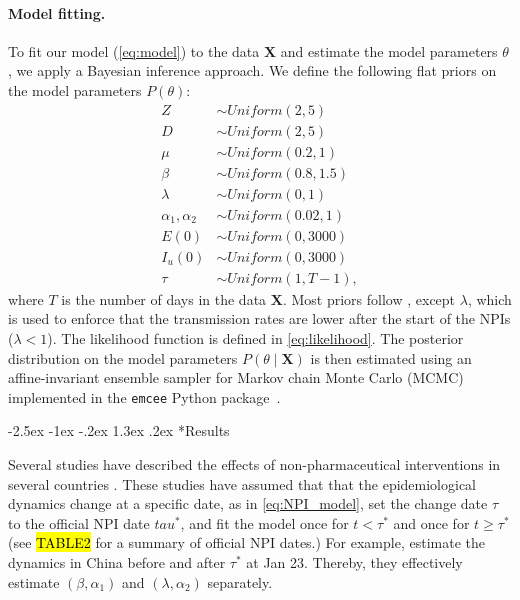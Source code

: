\documentclass[12pt]{extarticle}
\makeatletter
\renewcommand\section{\@startsection {section}{1}{\z@}%
     {-2.5ex \@plus -1ex \@minus -.2ex}%
     {1.3ex \@plus.2ex}%
    {\Large\bfseries}}
\let\vec\mathbf
\makeatother
\begin{document}
\paragraph*{Model fitting.}
To fit our model (\autoref{eq:model}) to the data $\vec{X}$ and estimate the model parameters $\theta$, we apply a Bayesian inference approach.
We define the following flat priors on the model parameters $P(\theta)$:
\begin{equation} \label{eq:priors}
\begin{aligned} %
Z & \sim \mathit{Uniform}(2, 5) \\
D & \sim \mathit{Uniform}(2, 5) \\
\mu & \sim \mathit{Uniform}(0.2, 1) \\
\beta & \sim \mathit{Uniform}(0.8, 1.5) \\
\lambda & \sim \mathit{Uniform}(0, 1) \\
\alpha_1, \alpha_2 & \sim \mathit{Uniform}(0.02, 1)\\
E(0) & \sim \mathit{Uniform}(0, 3000) \\
I_u(0) & \sim \mathit{Uniform}(0, 3000) \\
\tau &\sim \mathit{Uniform}(1, T-1),
\end{aligned}
\end{equation}
where $T$ is the number of days in the data $\vec{X}$.
Most priors follow \citet{Li2020}, except $\lambda$, which is used to enforce that the transmission rates are lower after the start of the NPIs ($\lambda < 1$).
The likelihood function is defined in \autoref{eq:likelihood}.
The posterior distribution on the model parameters $P(\theta \mid \vec{X})$ is then estimated using an affine-invariant ensemble sampler for Markov chain Monte Carlo (MCMC) implemented in the \texttt{emcee} Python package~\citep{Foreman-Mackey2013}.

\section*{Results}

Several studies have described the effects of non-pharmaceutical interventions in several countries \citep{Flaxman2020,Gatto2020}. 
These studies have assumed that that the epidemiological dynamics change at a specific date, as in \autoref{eq:NPI_model}, set the change date $\tau$ to the official NPI date $tau^*$, and fit the model once for $t<\tau^*$ and once for $t \ge \tau^*$ (see \hl{TABLE2} for a summary of official NPI dates.)
For example, \citet{Li2020} estimate the dynamics in China before and after $\tau^*$ at Jan 23. Thereby, they effectively estimate $(\beta, \alpha_1)$ and $(\lambda, \alpha_2)$ separately.
\end{document}
